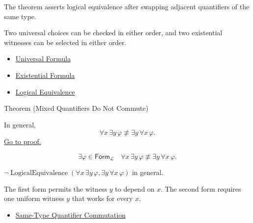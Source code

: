 \begin{remark*}
The theorem asserts logical equivalence after swapping adjacent quantifiers of
the same type.
\end{remark*}

\begin{remark*}[Interpretation]
Two universal choices can be checked in either order, and two existential
witnesses can be selected in either order.
\end{remark*}

\begin{dependencies}
\begin{itemize}
  \item \hyperref[def:universal-q]{Universal Formula}
  \item \hyperref[def:existential-q]{Existential Formula}
  \item \hyperref[def:log-equiv]{Logical Equivalence}
\end{itemize}
\end{dependencies}

\begin{theorembox}{Theorem (Mixed Quantifiers Do Not Commute)}
\begin{theorem}
\label{thm:mixed-quantifiers-do-not-commute}
In general,
\[
\forall x\,\exists y\,\varphi
\not\equiv
\exists y\,\forall x\,\varphi.
\]
\hyperref[prf:mixed-quantifiers-do-not-commute]{Go to proof.}
\end{theorem}
\end{theorembox}

\begin{remark*}
\[
\exists \varphi\in\mathsf{Form}_{\mathcal L}\quad
\forall x\,\exists y\,\varphi
\not\equiv
\exists y\,\forall x\,\varphi.
\]
\end{remark*}

\begin{remark*}
\(\neg\operatorname{LogicalEquivalence}(\forall x\,\exists y\,\varphi,
\exists y\,\forall x\,\varphi)\) in general.
\end{remark*}

\begin{remark*}[Interpretation]
The first form permits the witness \(y\) to depend on \(x\). The second form
requires one uniform witness \(y\) that works for every \(x\).
\end{remark*}

\begin{dependencies}
\begin{itemize}
  \item \hyperref[thm:qcomm]{Same-Type Quantifier Commutation}
\end{itemize}
\end{dependencies}

